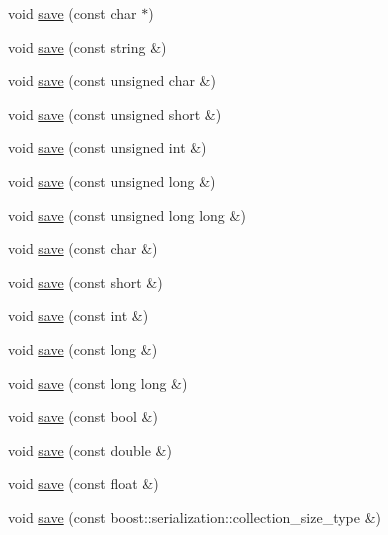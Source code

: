 \begin{DoxyCompactItemize}
\item 
void \hyperlink{classxtd_1_1servers_1_1app_1_1HtmlOArchive_a25bc0aa46ecbc81d01e50e318d85136f}{save} (const char $\ast$)
\item 
void \hyperlink{classxtd_1_1servers_1_1app_1_1HtmlOArchive_ab4a02b5763b656039665add3da76d56f}{save} (const string \&)
\item 
void \hyperlink{classxtd_1_1servers_1_1app_1_1HtmlOArchive_ac34aa74161df424b2a19e41b0c405c25}{save} (const unsigned char \&)
\item 
void \hyperlink{classxtd_1_1servers_1_1app_1_1HtmlOArchive_ac86a79783a5ca046d5eda24a9e6fc558}{save} (const unsigned short \&)
\item 
void \hyperlink{classxtd_1_1servers_1_1app_1_1HtmlOArchive_a5d426b7d61941d71ca43730cdb055055}{save} (const unsigned int \&)
\item 
void \hyperlink{classxtd_1_1servers_1_1app_1_1HtmlOArchive_a4082468458d3b4966bb75d4b92f0d476}{save} (const unsigned long \&)
\item 
void \hyperlink{classxtd_1_1servers_1_1app_1_1HtmlOArchive_a146b049587fa8d292fb9f90f3e23f59b}{save} (const unsigned long long \&)
\item 
void \hyperlink{classxtd_1_1servers_1_1app_1_1HtmlOArchive_a70c1e6b78feb34413275e208fd043964}{save} (const char \&)
\item 
void \hyperlink{classxtd_1_1servers_1_1app_1_1HtmlOArchive_a7dd264fc7222a8689764f4d8ab5c033b}{save} (const short \&)
\item 
void \hyperlink{classxtd_1_1servers_1_1app_1_1HtmlOArchive_af94e2907eba4d436906dc61f57459cd3}{save} (const int \&)
\item 
void \hyperlink{classxtd_1_1servers_1_1app_1_1HtmlOArchive_a2e99b889f990c3fa26b24b6ca1684265}{save} (const long \&)
\item 
void \hyperlink{classxtd_1_1servers_1_1app_1_1HtmlOArchive_addee578d18549c53b00e4c676a568c25}{save} (const long long \&)
\item 
void \hyperlink{classxtd_1_1servers_1_1app_1_1HtmlOArchive_a468a544e41a404c35321f89b1d4cb59c}{save} (const bool \&)
\item 
void \hyperlink{classxtd_1_1servers_1_1app_1_1HtmlOArchive_a5e14af7ab3311cf61fafe8b2742e22be}{save} (const double \&)
\item 
void \hyperlink{classxtd_1_1servers_1_1app_1_1HtmlOArchive_ab9f8811eb20eb372e6cabfa328d2ccf6}{save} (const float \&)
\item 
void \hyperlink{classxtd_1_1servers_1_1app_1_1HtmlOArchive_a9029ddca116a4a843ec6668d1bc3fc90}{save} (const boost\-::serialization\-::collection\-\_\-size\-\_\-type \&)

\end{DoxyCompactItemize}
